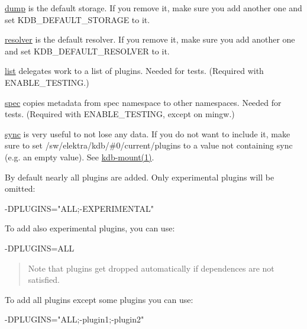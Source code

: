 \begin{DoxyItemize}
\item \hyperlink{md_src_plugins_dump_README_src_plugins_dump_README_md}{dump} is the default storage. If you remove it, make sure you add another one and set {\ttfamily K\+D\+B\+\_\+\+D\+E\+F\+A\+U\+L\+T\+\_\+\+S\+T\+O\+R\+A\+GE} to it.
\item \hyperlink{md_src_plugins_resolver_README_src_plugins_resolver_README_md}{resolver} is the default resolver. If you remove it, make sure you add another one and set {\ttfamily K\+D\+B\+\_\+\+D\+E\+F\+A\+U\+L\+T\+\_\+\+R\+E\+S\+O\+L\+V\+ER} to it.
\item \hyperlink{md_src_plugins_list_README_src_plugins_list_README_md}{list} delegates work to a list of plugins. Needed for tests. (Required with {\ttfamily E\+N\+A\+B\+L\+E\+\_\+\+T\+E\+S\+T\+I\+NG}.)
\item \hyperlink{md_src_plugins_spec_README_src_plugins_spec_README_md}{spec} copies metadata from spec namespace to other namespaces. Needed for tests. (Required with {\ttfamily E\+N\+A\+B\+L\+E\+\_\+\+T\+E\+S\+T\+I\+NG}, except on mingw.)
\item \hyperlink{md_src_plugins_sync_README_src_plugins_sync_README_md}{sync} is very useful to not lose any data. If you do not want to include it, make sure to set {\ttfamily /sw/elektra/kdb/\#0/current/plugins} to a value not containing sync (e.\+g. an empty value). See \hyperlink{doc_help_kdb-mount_md}{kdb-\/mount(1)}.
\end{DoxyItemize}

By default nearly all plugins are added. Only experimental plugins will be omitted\+:


\begin{DoxyCode}
-DPLUGINS="ALL;-EXPERIMENTAL"
\end{DoxyCode}


To add also experimental plugins, you can use\+:


\begin{DoxyCode}
-DPLUGINS=ALL
\end{DoxyCode}


\begin{quote}
Note that plugins get dropped automatically if dependences are not satisfied. \end{quote}


To add all plugins except some plugins you can use\+:


\begin{DoxyCode}
-DPLUGINS="ALL;-plugin1;-plugin2"
\end{DoxyCode}


